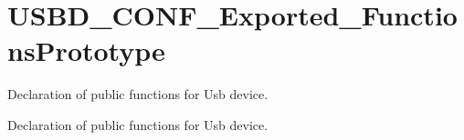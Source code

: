 \hypertarget{group__USBD__CONF__Exported__FunctionsPrototype}{}\section{U\+S\+B\+D\+\_\+\+C\+O\+N\+F\+\_\+\+Exported\+\_\+\+Functions\+Prototype}
\label{group__USBD__CONF__Exported__FunctionsPrototype}


Declaration of public functions for Usb device.  


Declaration of public functions for Usb device. 

